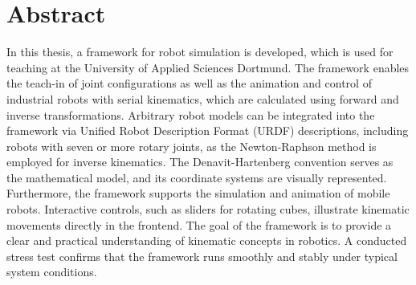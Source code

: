 \section*{Abstract}
In this thesis, a framework for robot simulation is developed, which is used for teaching at the University of Applied Sciences Dortmund.  
The framework enables the teach-in of joint configurations as well as the animation and control of industrial robots with serial kinematics,  
which are calculated using forward and inverse transformations.  
Arbitrary robot models can be integrated into the framework via Unified Robot Description Format (URDF) descriptions, including robots with seven or more rotary joints,  
as the Newton-Raphson method is employed for inverse kinematics.  
The Denavit-Hartenberg convention serves as the mathematical model, and its coordinate systems are visually represented.  
Furthermore, the framework supports the simulation and animation of mobile robots.  
Interactive controls, such as sliders for rotating cubes, illustrate kinematic movements directly in the frontend.  
The goal of the framework is to provide a clear and practical understanding of kinematic concepts in robotics.  
A conducted stress test confirms that the framework runs smoothly and stably under typical system conditions.

